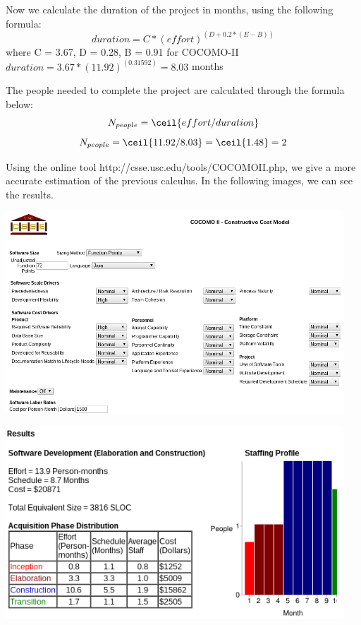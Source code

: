 	\newline 
	Now we calculate the duration of the project in months, using the following formula:
	$$duration = C*(effort)^(D+0.2*(E-B))$$ where C = 3.67, D = 0.28, B = 0.91 for COCOMO-II
	$duration = 3.67*(11.92)^(0.31592) = 8.03$ months
	
	\newline
	The people needed to complete the project are calculated through the formula below:
	$$N_{people} = \ceil{effort/duration} $$
	$$N_{people} = \ceil{11.92/8.03} = \ceil{1.48} = 2$$
	
	Using the online tool {http://csse.usc.edu/tools/COCOMOII.php}, we give a more accurate estimation of the previous calculus. In the following images, we can see the results.  
	
	\begin{center}
			\includegraphics[width=0.95\textwidth]{./images/cocomo1.png}
	\end{center}
	
	\begin{center}
			\includegraphics[width=0.95\textwidth]{./images/cocomo2.png}
	\end{center}
	 